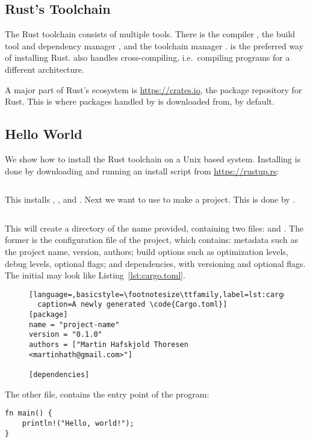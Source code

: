 \documentclass[b5paper]{report}
\begin{document}
\begin{appendices}
  \chapter{Rust's Toolchain}
  The Rust toolchain consists of multiple tools.
  There is the compiler \rustc{}, the build tool and dependency manager \cargo{},
  and the toolchain manager \rustup.
  \rustup{} is the preferred way of installing Rust.
  \rustup{} also handles cross-compiling, i.e.\ compiling programs for a different
  architecture.

  A major part of Rust's ecosystem is \url{https://crates.io}, the package repository
  for Rust. This is where packages handled by \cargo{} is downloaded from, by default.

  \section{Hello World}
  We show how to install the Rust toolchain on a Unix based system.
  Installing \rustup{} is done by downloading and running an install script from
  \url{https://rustup.rs}:
  \begin{lstlisting}[language=Bash,numbers=none]
% curl https://sh.rustup.rs -sSf | sh
  \end{lstlisting}
  This installs \rustup{}, \cargo{}, and \rustc{}.
  Next we want to use \cargo{} to make a project. This is done by .
  \begin{lstlisting}[language=Bash,numbers=none]
% cargo init --bin <name-of-project>
  \end{lstlisting}
  This will create a directory of the name provided, containing two files:
   and .
  The former is the configuration file of the project, which contains:
  metadata such as the project name, version, authors;
  build options such as optimization levels, debug levels, optional flags;
  and dependencies, with versioning and optional flags.
  The initial  may look like Listing~\ref{lst:cargo.toml}.
  \begin{figure}[ht]
  \begin{lstlisting}[language=,basicstyle=\footnotesize\ttfamily,label=lst:cargo.toml,
  caption=A newly generated \code{Cargo.toml}]
[package]
name = "project-name"
version = "0.1.0"
authors = ["Martin Hafskjold Thoresen <martinhath@gmail.com>"]

[dependencies]
  \end{lstlisting}
\end{figure}
  The other file,  contains the entry point of the program:
  \begin{lstlisting}
fn main() {
    println!("Hello, world!");
}
  \end{lstlisting}


\end{appendices}
\end{document}
